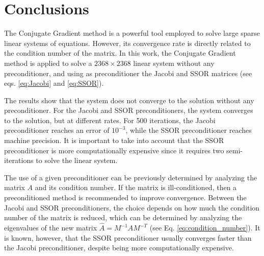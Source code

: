 \section{Conclusions} \label{sec:conclusions}
The Conjugate Gradient method is a powerful tool employed to solve large sparse linear systems of equations. However, its convergence rate is directly related to the condition number of the matrix. In this work, the Conjugate Gradient method is applied to solve a $2368 \times 2368$ linear system without any preconditioner, and using as preconditioner the Jacobi and SSOR matrices (see eqs. \eqref{eq:Jacobi} and \eqref{eq:SSOR}).

The results show that the system does not converge to the solution without any preconditioner. For the Jacobi and SSOR preconditioners, the system converges to the solution, but at different rates. For 500 iterations, the Jacobi preconditioner reaches an error of $10^{-3}$, while the SSOR preconditioner reaches machine precision. It is important to take into account that the SSOR preconditioner is more computationally expensive since it requires two semi-iterations to solve the linear system. 

The use of a given preconditioner can be previously determined by analyzing the matrix $A$ and its condition number. If the matrix is ill-conditioned, then a preconditioned method is recommended to improve convergence. Between the Jacobi and SSOR preconditioners, the choice depends on how much the condition number of the matrix is reduced, which can be determined by analyzing the eigenvalues of the new matrix $\hat{A} = M^{-1}AM^{-T}$ (see Eq. \eqref{eq:condition_number}). It is known, however, that the SSOR preconditioner usually converges faster than the Jacobi preconditioner, despite being more computationally expensive.

